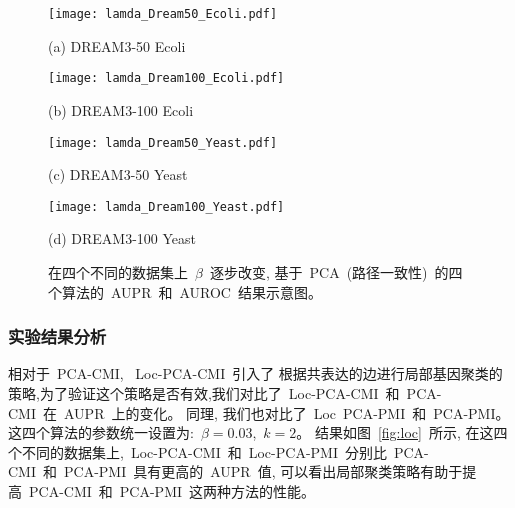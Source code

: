 \begin{figure*}[!htbp]
    \centering
    \begin{minipage}[b]{0.45\linewidth}
      \centering
      \centerline{
        \texttt{[image: lamda\_Dream50\_Ecoli.pdf]}}
      \centerline{(a) DREAM3-50 Ecoli}
      \medskip  
    \end{minipage}
    \begin{minipage}[b]{0.45\linewidth}
      \centering
      \centerline{
        \texttt{[image: lamda\_Dream100\_Ecoli.pdf]}}
      \centerline{(b) DREAM3-100 Ecoli}
      \medskip  
    \end{minipage}
      \begin{minipage}[b]{0.45\linewidth}
      \centering
      \centerline{
        \texttt{[image: lamda\_Dream50\_Yeast.pdf]}}
      \centerline{(c) DREAM3-50 Yeast}
      \medskip  
    \end{minipage}
    \begin{minipage}[b]{0.45\linewidth}
      \centering
      \centerline{
        \texttt{[image: lamda\_Dream100\_Yeast.pdf]}}
      \centerline{(d) DREAM3-100 Yeast}
      \medskip  
    \end{minipage}
    \caption{%
    在四个不同的数据集上~$\beta$~逐步改变, 基于~PCA~(路径一致性)~的四个算法的~AUPR~和~AUROC~结果示意图。
    }
    \label{fig:beta}
\end{figure*}

\subsubsection{实验结果分析}

相对于~PCA-CMI, ~Loc-PCA-CMI~引入了
根据共表达的边进行局部基因聚类的策略,为了验证这个策略是否有效,我们对比了~Loc-PCA-CMI~和~PCA-CMI~在~AUPR~上的变化。
同理, 我们也对比了~Loc~PCA-PMI~和~PCA-PMI。
这四个算法的参数统一设置为:~$\beta = 0.03$,~$k = 2$。
结果如图~\ref{fig:loc}~所示,
在这四个不同的数据集上,~Loc-PCA-CMI~和~Loc-PCA-PMI~分别比~PCA-CMI~和~PCA-PMI~具有更高的~AUPR~值,
可以看出局部聚类策略有助于提高~PCA-CMI~和~PCA-PMI~这两种方法的性能。

